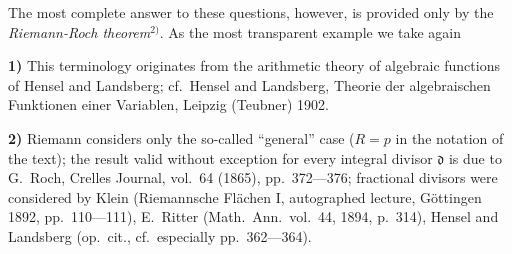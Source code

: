 \documentclass{article}
\begin{document}
The most complete answer to these questions, however, is provided only by the \emph{Riemann-Roch theorem}${}^{2)}$. As the most transparent example we take again

\textbf{1)} This terminology originates from the arithmetic theory of algebraic functions of Hensel and Landsberg; cf.\ Hensel and Landsberg, Theorie der algebraischen Funktionen einer Variablen, Leipzig (Teubner) 1902.

\textbf{2)} Riemann considers only the so-called ``general'' case ($R = p$ in the notation of the text); the result valid without exception for every integral divisor $\mathfrak{d}$ is due to G.~Roch, Crelles Journal, vol.~64 (1865), pp.~372---376; fractional divisors were considered by Klein (Riemannsche Flächen I, autographed lecture, Göttingen 1892, pp.~110---111), E.~Ritter (Math.\ Ann.\ vol.~44, 1894, p.~314), Hensel and Landsberg (op.\ cit., cf.\ especially pp.~362---364).
\end{document}
